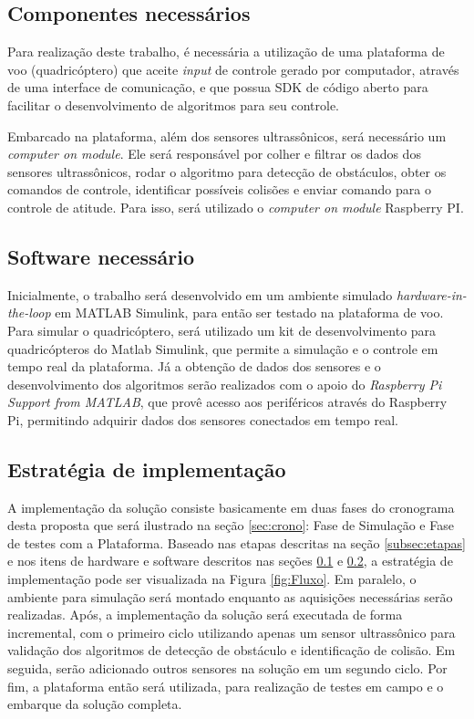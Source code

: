 \documentclass[a4paper, 12pt]{article}
\begin{document}
\subsection{Componentes necessários}

\label{subsec:hardware}

Para realização deste trabalho, é necessária a utilização de uma plataforma de voo (quadricóptero) que aceite \textit{input} de controle gerado por computador, através de uma interface de comunicação, e que possua SDK de código aberto para facilitar o desenvolvimento de algoritmos para seu controle.

Embarcado na plataforma, além dos sensores ultrassônicos, será necessário um \textit{computer on module}. Ele será responsável por colher e filtrar os dados dos sensores ultrassônicos, rodar o algoritmo para detecção de obstáculos, obter os comandos de controle, identificar possíveis colisões e enviar comando para o controle de atitude. Para isso, será utilizado o \textit{computer on module} Raspberry PI. 

\subsection{Software necessário}

\label{subsec:software}

Inicialmente, o trabalho será desenvolvido em um ambiente simulado \textit{hardware-in-the-loop} em MATLAB Simulink, para então ser testado na plataforma de voo. Para simular o quadricóptero, será utilizado um kit de desenvolvimento para quadricópteros do Matlab Simulink, que permite a simulação e o controle em tempo real da plataforma. Já a obtenção de dados dos sensores e o desenvolvimento dos algoritmos serão realizados com o apoio do \textit{Raspberry Pi Support from MATLAB}, que provê acesso aos periféricos através do Raspberry Pi, permitindo adquirir dados dos sensores conectados em tempo real.

\subsection{Estratégia de implementação}

A implementação da solução consiste basicamente em duas fases do cronograma desta proposta que será ilustrado na seção \ref{sec:crono}: Fase de Simulação e Fase de testes com a Plataforma. Baseado nas etapas descritas na seção \ref{subsec:etapas} e nos itens de hardware e software descritos nas seções \ref{subsec:hardware} e \ref{subsec:software}, a estratégia de implementação pode ser visualizada na Figura \ref{fig:Fluxo}. Em paralelo, o ambiente para simulação será montado enquanto as aquisições necessárias serão realizadas. Após, a implementação da solução será executada de forma incremental, com o primeiro ciclo utilizando apenas um sensor ultrassônico para validação dos algoritmos de detecção de obstáculo e identificação de colisão. Em seguida, serão adicionado outros sensores na solução em um segundo ciclo. Por fim, a plataforma então será utilizada, para realização de testes em campo e o embarque da solução completa.
  
\end{document}
